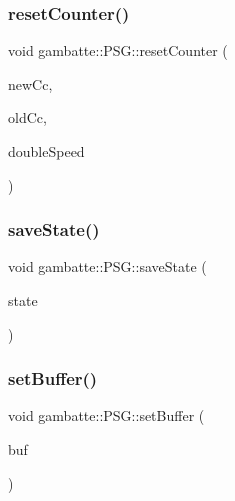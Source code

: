 \mbox{\label{classgambatte_1_1PSG_ab3ad75652ca8508592a7a55df874d4ca}} 
\subsubsection{\texorpdfstring{reset\+Counter()}{resetCounter()}}
{\footnotesize\ttfamily void gambatte\+::\+P\+S\+G\+::reset\+Counter (\begin{DoxyParamCaption}\item[{unsigned}]{new\+Cc,  }\item[{unsigned}]{old\+Cc,  }\item[{bool}]{double\+Speed }\end{DoxyParamCaption})}

\mbox{\label{classgambatte_1_1PSG_a2b892219d0ea5bf3f7954e2e68e3f7f6}} 
\subsubsection{\texorpdfstring{save\+State()}{saveState()}}
{\footnotesize\ttfamily void gambatte\+::\+P\+S\+G\+::save\+State (\begin{DoxyParamCaption}\item[{\hyperlink{structgambatte_1_1SaveState}{Save\+State} \&}]{state }\end{DoxyParamCaption})}

\mbox{\label{classgambatte_1_1PSG_a7c5a2474671eac749dc35959f76762d3}} 
\subsubsection{\texorpdfstring{set\+Buffer()}{setBuffer()}}
{\footnotesize\ttfamily void gambatte\+::\+P\+S\+G\+::set\+Buffer (\begin{DoxyParamCaption}\item[{\hyperlink{namespacegambatte_a0639f09fccfbbd5a8e0796318768e370}{uint\+\_\+least32\+\_\+t} $\ast$}]{buf }\end{DoxyParamCaption})\hspace{0.3cm}{\ttfamily [inline]}}

